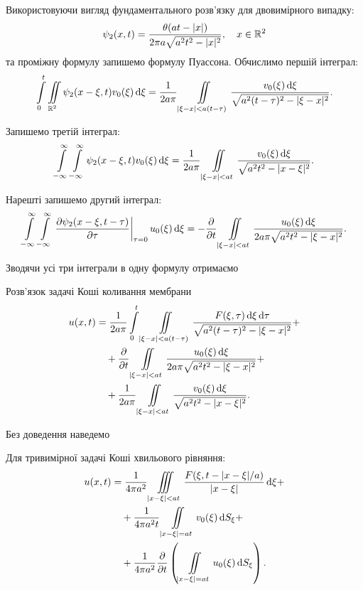 Використовуючи вигляд фундаментального розв'язку для двовимірного випадку:
\begin{equation}
	\psi_2(x, t) = \frac{\theta(a t - |x|)}	{2 \pi a \sqrt{a^2 t^2 - |x|^2}}, \quad x \in \mathbb{R}^2
\end{equation}
та проміжну формулу запишемо формулу Пуассона. Обчислимо першій інтеграл:
\begin{equation}
	\displaystyle\int\limits_0^t \displaystyle\iint\limits_{\mathbb{R}^2} \psi_2(x - \xi, t) v_0(\xi) \mathop{}\!\mathrm{d} \xi = \frac{1}{2 a \pi} \displaystyle\iint\limits_{|\xi - x| < a (t - \tau)} \frac{v_0(\xi) \mathop{}\!\mathrm{d} \xi}{\sqrt{a^2 (t - \tau)^2 - |\xi - x|^2}}.
\end{equation}

Запишемо третій інтеграл:
\begin{equation}
	\displaystyle\int\limits_{-\infty}^\infty \displaystyle\int\limits_{-\infty}^\infty \psi_2(x - \xi, t) v_0(\xi) \mathop{}\!\mathrm{d} \xi = \frac{1}{2 a \pi} \displaystyle\iint\limits_{|\xi - x| < a t} \frac{v_0(\xi) \mathop{}\!\mathrm{d} \xi}{\sqrt{a^2 t^2 - |x - \xi|^2}}.
\end{equation}

Нарешті запишемо другий інтеграл:
\begin{equation}
	\displaystyle\int\limits_{-\infty}^\infty \displaystyle\int\limits_{-\infty}^\infty \left. \frac{\partial \psi_2(x - \xi, t - \tau)}{\partial \tau} \right|_{\tau = 0} u_0(\xi) \mathop{}\!\mathrm{d} \xi = - \frac{\partial}{\partial t} \displaystyle\iint\limits_{|\xi - x| < a t} \frac{u_0(\xi) \mathop{}\!\mathrm{d} \xi}{2 a \pi \sqrt{a^2 t^2 - |\xi - x|^2}}.
\end{equation}

Зводячи усі три інтеграли в одну формулу отримаємо
\begin{th_formula}[Пуассона]
	Розв'язок задачі Коші коливання мембрани
	\begin{equation}
		\begin{aligned}
			u(x, t) &= \frac{1}{2 a \pi} \displaystyle\int\limits_0^t \displaystyle\iint\limits_{|\xi - x| < a (t - \tau)} \frac{F(\xi, \tau) \mathop{}\!\mathrm{d} \xi \mathop{}\!\mathrm{d} \tau}{\sqrt{a^2 (t - \tau)^2 - |\xi - x|^2}} + \\
			& \quad + \frac{\partial}{\partial t} \displaystyle\iint\limits_{|\xi - x| < a t} \frac{u_0(\xi) \mathop{}\!\mathrm{d} \xi}{2 a \pi \sqrt{a^2 t^2 - |\xi - x|^2}} + \\
			& \quad + \frac{1}{2 a \pi} \displaystyle\iint\limits_{|\xi - x| < a t} \frac{v_0(\xi) \mathop{}\!\mathrm{d} \xi}{\sqrt{a^2 t^2 - |x - \xi|^2}}.
		\end{aligned}
	\end{equation}
\end{th_formula}

Без доведення наведемо 
\begin{th_formula}[Кіргофа]
	Для тривимірної задачі Коші хвильового рівняння:
	\begin{equation}
		\begin{aligned}
			u(x, t) &= \frac{1}{4 \pi a^2} \displaystyle\iiint\limits_{|x - \xi| < a t} \frac{F(\xi, t - |x - \xi| / a)}{|x - \xi|} \mathop{}\!\mathrm{d} \xi + \\
			& \quad + \frac{1}{4 \pi a^2 t} \displaystyle\iint\limits_{|x - \xi| = a t} v_0(\xi) \mathop{}\!\mathrm{d} S_\xi + \\
			& \quad + \frac{1}{4 \pi a^2} \frac{\partial}{\partial t} \left( \displaystyle\iint\limits_{|x - \xi| = a t} u_0(\xi) \mathop{}\!\mathrm{d} S_\xi \right).
		\end{aligned}
	\end{equation}
\end{th_formula}

